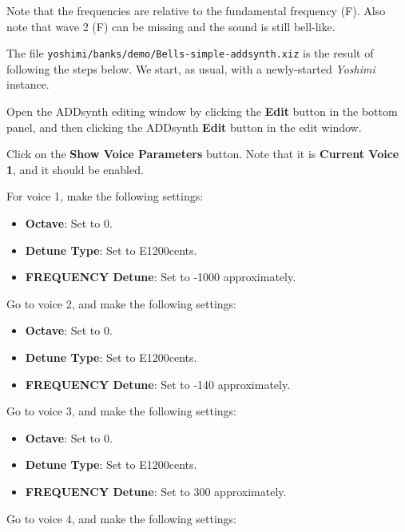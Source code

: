    Note that the frequencies are relative to the fundamental frequency (F).
   Also note that wave 2 (F) can be missing and the sound is still
   bell-like.

   The file \texttt{yoshimi/banks/demo/Bells-simple-addsynth.xiz} is the
   result of following the steps below.  We start, as usual, with a
   newly-started \textsl{Yoshimi} instance.

   \begin{enumber}
      \item Open the ADDsynth editing window by clicking the \textbf{Edit}
         button in the bottom panel, and then clicking the ADDsynth
         \textbf{Edit} button in the edit window.
      \item Click on the \textbf{Show Voice Parameters} button.
         Note that it is \textbf{Current Voice 1}, and it should be enabled.
      \item For voice 1, make the following settings:
         \begin{itemize}
            \item \textbf{Octave}: Set to 0.
            \item \textbf{Detune Type}: Set to E1200cents.
            \item \textbf{FREQUENCY Detune}: Set to -1000 approximately.
         \end{itemize}
      \item Go to voice 2, and make the following settings:
         \begin{itemize}
            \item \textbf{Octave}: Set to 0.
            \item \textbf{Detune Type}: Set to E1200cents.
            \item \textbf{FREQUENCY Detune}: Set to -140 approximately.
         \end{itemize}
      \item Go to voice 3, and make the following settings:
         \begin{itemize}
            \item \textbf{Octave}: Set to 0.
            \item \textbf{Detune Type}: Set to E1200cents.
            \item \textbf{FREQUENCY Detune}: Set to 300 approximately.
         \end{itemize}
      \item Go to voice 4, and make the following settings:
         \begin{itemize}

\end{itemize}
\end{enumber}
